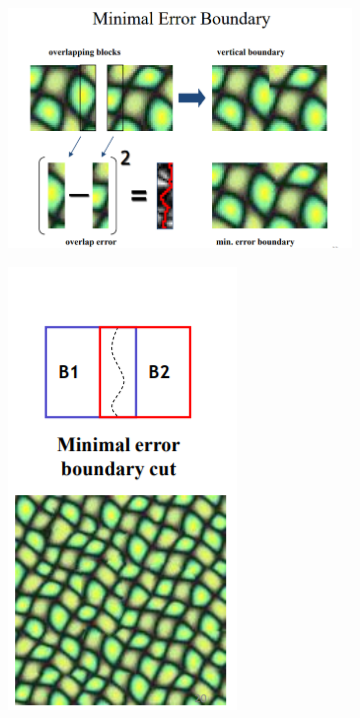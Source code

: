 \documentclass[a4paper,12pt]{article}
\begin{document}
\begin{figure}[H]
	\centering
	\begin{subfigure}{0.7\textwidth}
		\centering
		\includegraphics[width=.9\textwidth]{5.png}
	\end{subfigure}%
	\begin{subfigure}{0.3\textwidth}
		\centering
		\includegraphics[width=.9\textwidth]{6.png}
	\end{subfigure}%
\end{figure}
\end{document}
